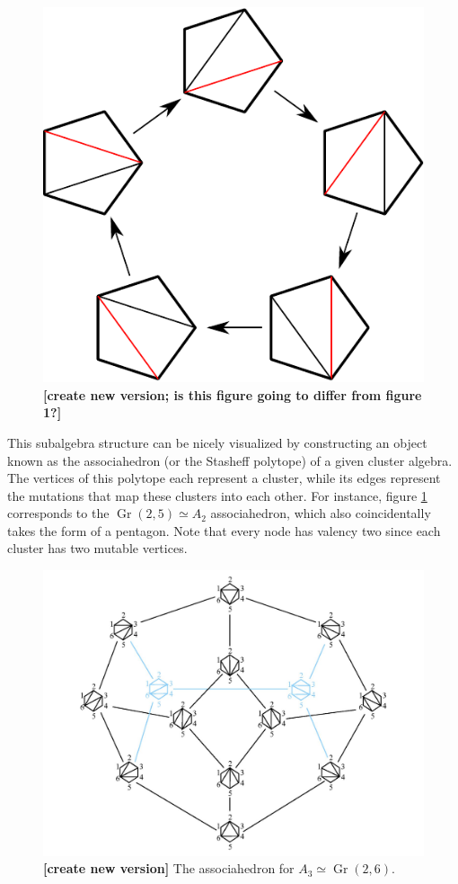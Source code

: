 \documentclass[11pt]{article}
\DeclareMathOperator{\Gr}{Gr}
\def\draftnote#1{{\bf [#1]}}
\begin{document}
\begin{figure}
  \centering
  \includegraphics[scale=0.6]{pentagon-triangulations}
  \caption{\draftnote{create new version; is this figure going to differ from figure 1?}}
  \label{fig:a2-poly}
\end{figure}

This subalgebra structure can be nicely visualized by constructing an object known as the associahedron (or the Stasheff polytope) of a given cluster algebra. The vertices of this polytope each represent a cluster, while its edges represent the mutations that map these clusters into each other. For instance, figure \ref{fig:a2-poly} corresponds to the $\Gr(2,5) \simeq A_2$ associahedron, which also coincidentally takes the form of a pentagon. Note that every node has valency two since each cluster has two mutable vertices.

\begin{figure}[t]
  \centering
  \includegraphics[scale=0.25]{a3-associahedron}
  \caption{ \draftnote{create new version} The associahedron for $A_3\simeq\Gr(2,6)$.}
  \label{fig:a3-poly}
\end{figure}
\end{document}

